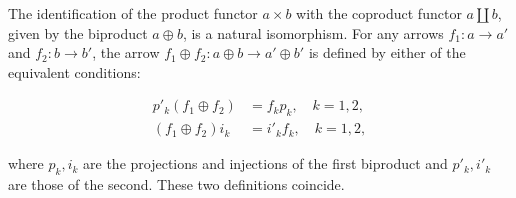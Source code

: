 The identification of the product functor $a \times b$ with the coproduct functor $a \amalg b$, given by the biproduct $a \oplus b$, is a natural isomorphism. For any arrows $f_1 : a \rightarrow a'$ and $f_2 : b \rightarrow b'$, the arrow $f_1 \oplus f_2 : a \oplus b \rightarrow a' \oplus b'$ is defined by either of the equivalent conditions:

$$\begin{aligned}
p'_k (f_1 \oplus f_2) &= f_k p_k, \quad k = 1, 2, \\
(f_1 \oplus f_2) i_k &= i'_k f_k, \quad k = 1, 2,
\end{aligned}$$

where $p_k, i_k$ are the projections and injections of the first biproduct and $p'_k, i'_k$ are those of the second. These two definitions coincide.

